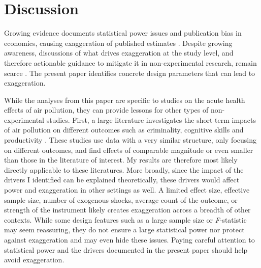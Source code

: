 \documentclass[12pt]{article}
\begin{document}



\section{Discussion}\label{section_discussion}

	Growing evidence documents statistical power issues and publication bias in economics, causing exaggeration of published estimates \citep{brodeur_star_2016, ioannidis_power_2017, brodeur_methods_2020, ferraro_feature_2020}. Despite growing awareness, discussions of what drives exaggeration at the study level, and therefore actionable guidance to mitigate it in non-experimental research, remain scarce \citep{altoe_enhancing_2020, black_simulated_2022}. The present paper identifies concrete design parameters that can lead to exaggeration.
	
	While the analyses from this paper are specific to studies on the acute health effects of air pollution, they can provide lessons for other types of non-experimental studies. First, a large literature investigates the short-term impacts of air pollution on different outcomes such as criminality, cognitive skills and productivity \citep[for instance]{herrnstadt_air_2021, ebenstein_long-run_2016, adhvaryu2022management}. These studies use data with a very similar structure, only focusing on different outcomes, and find effects of comparable magnitude or even smaller than those in the literature of interest. My results are therefore most likely directly applicable to these literatures. More broadly, since the impact of the drivers I identified can be explained theoretically, these drivers would affect power and exaggeration in other settings as well. A limited effect size, effective sample size, number of exogenous shocks, average count of the outcome, or strength of the instrument likely creates exaggeration across a breadth of other contexts. While some design features such as a large sample size or \textit{F}-statistic may seem reassuring, they do not ensure a large statistical power nor protect against exaggeration and may even hide these issues. Paying careful attention to statistical power and the drivers documented in the present paper should help avoid exaggeration.
	
\end{document}
